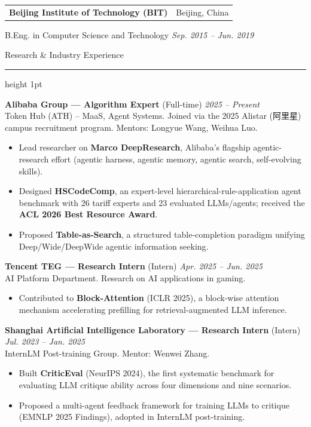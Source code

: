 \documentclass[10.5pt]{article}
\makeatletter
\newcommand{\cvsection}[1]{%
  \vspace{10pt}
  {\color{accent}\headingfont\Large #1}\par
  \vspace{2pt}
  {\color{accent}\hrule height 1pt}
  \vspace{6pt}
}
\newcommand{\entry}[3]{%
  \noindent\begin{tabularx}{\textwidth}{@{}X r@{}}
    \textbf{#1} & {\color{muted}\small #2} \\
  \end{tabularx}
  #3
}
\makeatother
\begin{document}
\entry{Beijing Institute of Technology (BIT)}{Beijing, China}{}
B.Eng. in Computer Science and Technology \hfill \textit{Sep. 2015 -- Jun. 2019}

\cvsection{Research \& Industry Experience}

\textbf{Alibaba Group --- Algorithm Expert} {\small\color{accent}(Full-time)} \hfill \textit{2025 -- Present}\\
Token Hub (ATH) -- MaaS, Agent Systems. Joined via the 2025 Alistar ({\cjkfont 阿里星}) campus recruitment program. Mentors: Longyue Wang, Weihua Luo.
\begin{itemize}
  \item Lead researcher on \textbf{Marco DeepResearch}, Alibaba's flagship agentic-research effort (agentic harness, agentic memory, agentic search, self-evolving skills).
  \item Designed \textbf{HSCodeComp}, an expert-level hierarchical-rule-application agent benchmark with 26 tariff experts and 23 evaluated LLMs/agents; received the \textbf{ACL 2026 Best Resource Award}.
  \item Proposed \textbf{Table-as-Search}, a structured table-completion paradigm unifying Deep/Wide/DeepWide agentic information seeking.
\end{itemize}

\textbf{Tencent TEG --- Research Intern} {\small\color{muted}(Intern)} \hfill \textit{Apr. 2025 -- Jun. 2025}\\
AI Platform Department. Research on AI applications in gaming.
\begin{itemize}
  \item Contributed to \textbf{Block-Attention} (ICLR 2025), a block-wise attention mechanism accelerating prefilling for retrieval-augmented LLM inference.
\end{itemize}

\textbf{Shanghai Artificial Intelligence Laboratory --- Research Intern} {\small\color{muted}(Intern)} \hfill \textit{Jul. 2023 -- Jan. 2025}\\
InternLM Post-training Group. Mentor: Wenwei Zhang.
\begin{itemize}
  \item Built \textbf{CriticEval} (NeurIPS 2024), the first systematic benchmark for evaluating LLM critique ability across four dimensions and nine scenarios.
  \item Proposed a multi-agent feedback framework for training LLMs to critique (EMNLP 2025 Findings), adopted in InternLM post-training.
\end{itemize}
\end{document}
